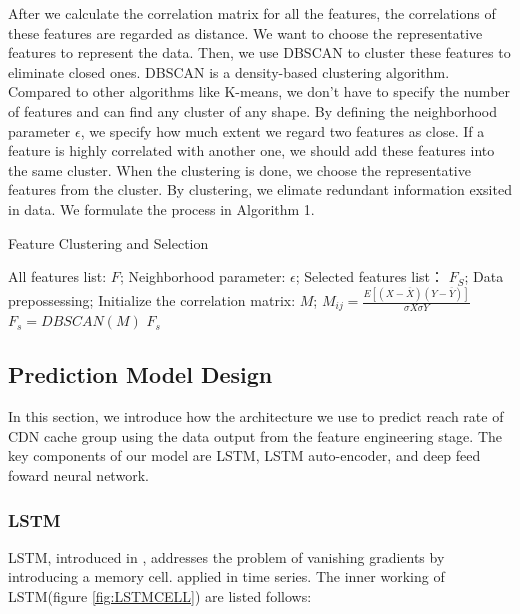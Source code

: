 \documentclass[5p]{elsarticle}
\newcommand{\dabiaolv}{reach rate }
\begin{document}
After we calculate the correlation matrix for all the features, the correlations of these features are regarded as distance. We want to choose the representative features to represent the data. Then, we use DBSCAN \cite{Ester1996A} to cluster these features to eliminate closed ones. DBSCAN is a density-based clustering algorithm. Compared to other algorithms like K-means, we don't have to specify the number of features and can find any cluster of any shape. By defining the neighborhood parameter $\epsilon$, we specify how much extent we regard two features as close. If a feature is highly correlated with another one, we should add these features into the same cluster. When the clustering is done, we choose the representative features from the cluster. By clustering, we elimate redundant information exsited in data. We formulate the process in Algorithm 1.

\begin{algorithm}[t]
\caption{Feature Clustering and Selection} 
\begin{algorithmic}[1]
\Require  
    All features list: $F$;
    Neighborhood parameter: $\epsilon$;
\Ensure  
    Selected features list： $F_S$;  
\State Data prepossessing;
\State Initialize the correlation matrix:  $M$;
        \State $M_{ij}= \frac{E[(X-\overline{X})(Y-\overline{Y})]}{\sigma{X}\sigma{Y}}$
    \EndFor
    \State 
\EndFor
\State  $F_s = DBSCAN(M)$
\State \Return $F_s$
\end{algorithmic}
\end{algorithm}


\subsection{Prediction Model Design}

In this section, we introduce how the architecture we use to predict \dabiaolv of CDN cache group using the data output from the feature engineering stage. The key components of our model are LSTM, LSTM auto-encoder, and deep feed foward neural network.

\subsubsection{LSTM}
LSTM, introduced in \cite{Hochreiter1997LongMemory}, addresses the problem of vanishing gradients by introducing a memory cell. \cite{MalhotraLongSeries} applied in time series. The inner working of LSTM(figure \ref{fig:LSTMCELL}) are listed follows:
\end{document}
